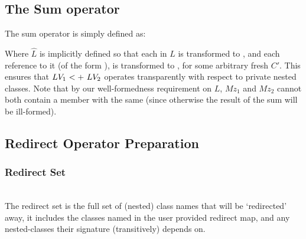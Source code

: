 \subsection{The Sum operator}
The sum operator is simply defined as:

\begin{defs}
{}
{}
\end{defs}
Where $\widehat{L}$ is implicitly defined so that each  in $L$ is transformed to , and each reference to it (of the form ), is transformed to , for some arbitrary fresh $C'$. This ensures that $\summ{LV_1}{LV_2}$ operates transparently with respect to private nested classes. Note that by our well-formedness requirement on $L$, $Mz_1$ and $Mz_2$ cannot both contain a member with the same \Id (since otherwise the result of the sum will be ill-formed).

\subsection{Redirect Operator Preparation}
\subsubsection{Redirect Set} \noindent\\ 
The redirect set is the full set of (nested) class names that will be `redirected' away, it includes the classes named in the user provided redirect map, and any nested-classes their signature (transitively) depends on.

